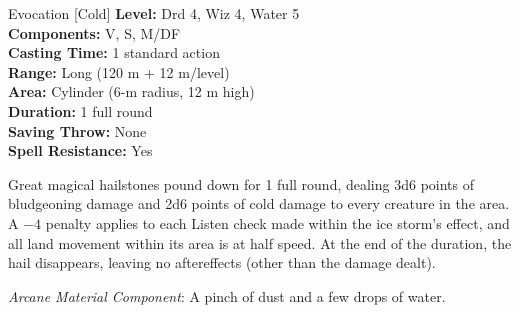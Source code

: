 {Evocation [Cold]}
{
	\textbf{Level:}
	Drd 4, Wiz 4, Water 5\\
	\textbf{Components:}
	V, S, M/DF\\
	\textbf{Casting Time:}
	1 standard action\\
	\textbf{Range:}
	Long (120 m + 12 m/level)\\
	\textbf{Area:}
	Cylinder (6-m radius, 12 m high)\\
	\textbf{Duration:}
	1 full round\\
	\textbf{Saving Throw:}
	None\\
	\textbf{Spell Resistance:}
	Yes\\
}
{
	Great magical hailstones pound down for 1 full round, dealing 3d6 points of bludgeoning damage and 2d6 points of cold damage to every creature in the area. A $-4$ penalty applies to each Listen check made within the ice storm's effect, and all land movement within its area is at half speed. At the end of the duration, the hail disappears, leaving no aftereffects (other than the damage dealt).

	\textit{Arcane Material Component}:
	A pinch of dust and a few drops of water.

}
